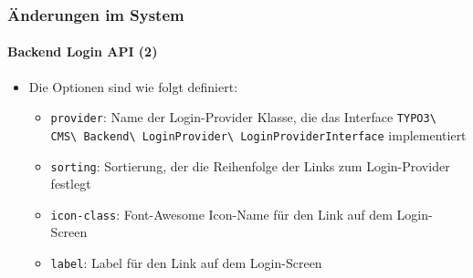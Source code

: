 \begin{frame}[fragile]
	\frametitle{Änderungen im System}
	\framesubtitle{Backend Login API (2)}

	\begin{itemize}

		\item Die Optionen sind wie folgt definiert:

			\begin{itemize}

				\item \texttt{provider}:\newline
					Name der Login-Provider Klasse, die das Interface
						\texttt{TYPO3\textbackslash
							CMS\textbackslash
							Backend\textbackslash
							LoginProvider\textbackslash
							LoginProviderInterface}
						implementiert

				\item \texttt{sorting}:\newline
					Sortierung, der die Reihenfolge der Links zum Login-Provider
					festlegt

				\item \texttt{icon-class}:\newline
					Font-Awesome Icon-Name für den Link auf dem Login-Screen

				\item \texttt{label}:\newline
					Label für den Link auf dem Login-Screen
			\end{itemize}

	\end{itemize}

\end{frame}


